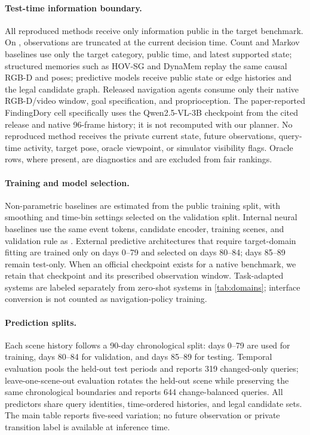 \paragraph{Test-time information boundary.}
All reproduced methods receive only information public in the target
benchmark. On \evolvingworldbench{}, observations are truncated at the current decision
time. Count and Markov baselines use only the target category, public time, and
latest supported state; structured memories such as HOV-SG and DynaMem replay
the same causal RGB-D and poses; predictive models receive public state or edge
histories and the legal candidate graph. Released navigation agents consume
only their native RGB-D/video window, goal specification, and proprioception.
The paper-reported FindingDory cell specifically uses the
Qwen2.5-VL-3B checkpoint from the cited release and native 96-frame history; it is not recomputed with
our planner. No reproduced method receives the private current state, future
observations, query-time activity, target pose, oracle viewpoint, or simulator
visibility flags. Oracle rows, where present, are diagnostics and are excluded
from fair rankings.

\paragraph{Training and model selection.}
Non-parametric baselines are estimated from the public training split, with
smoothing and time-bin settings selected on the validation split. Internal neural baselines use the
same event tokens, candidate encoder, training scenes, and validation rule as
\pfdnav{}. External predictive architectures that require target-domain fitting
are trained only on \evolvingworldbench{} days 0--79 and selected on days 80--84; days
85--89 remain test-only. When an official checkpoint exists for a native
benchmark, we retain that checkpoint and its prescribed observation window.
Task-adapted systems are labeled separately from zero-shot systems in
\cref{tab:domains}; interface conversion is not counted as navigation-policy
training.

\paragraph{Prediction splits.}
Each scene history follows a 90-day chronological split: days 0--79 are used
for training, days 80--84 for validation, and days 85--89 for testing. Temporal
evaluation pools the held-out test periods and reports 319 changed-only queries;
leave-one-scene-out evaluation rotates the held-out scene while preserving the
same chronological boundaries and reports 644 change-balanced queries. All
predictors share query identities, time-ordered histories, and legal candidate
sets. The main table reports five-seed variation; no future observation or
private transition label is available at inference time.

